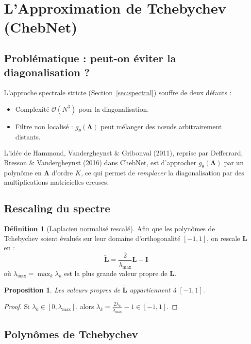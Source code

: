 \documentclass[12pt, a4paper]{article}
\newtheorem{proposition}[theorem]{Proposition}
\theoremstyle{definition}
\newtheorem{definition}[theorem]{Définition}
\newcommand{\mat}[1]{\mathbf{#1}}
\newcommand{\I}{\mat{I}}
\newcommand{\L}{\mat{L}}
\newcommand{\Lt}{\tilde{\mat{L}}}
\newcommand{\Lam}{\mat{\Lambda}}
\begin{document}
\section{L'Approximation de Tchebychev (ChebNet)}
\label{sec:chebnet}

\subsection{Problématique : peut-on éviter la diagonalisation ?}

L'approche spectrale stricte (Section~\ref{sec:spectral}) souffre de deux défauts :
\begin{itemize}
  \item Complexité $\mathcal{O}(N^3)$ pour la diagonalisation.
  \item Filtre non localisé : $g_\theta(\Lam)$ peut mélanger des nœuds arbitrairement distants.
\end{itemize}
L'idée de Hammond, Vandergheynst \& Gribonval (2011), reprise par Defferrard,
Bresson \& Vandergheynst (2016) dans ChebNet, est d'approcher $g_\theta(\Lam)$
par un polynôme en $\Lam$ d'ordre $K$, ce qui permet de \emph{remplacer}
la diagonalisation par des multiplications matricielles creuses.

\subsection{Rescaling du spectre}

\begin{definition}[Laplacien normalisé rescalé]
\label{def:rescaled_laplacian}
Afin que les polynômes de Tchebychev soient évalués sur leur domaine d'orthogonalité
$[-1, 1]$, on rescale $\L$ en :
\[
  \boxed{\Lt = \frac{2}{\lambda_{\max}} \L - \I}
\]
où $\lambda_{\max} = \max_k \lambda_k$ est la plus grande valeur propre de $\L$.
\end{definition}

\begin{proposition}
Les valeurs propres de $\Lt$ appartiennent à $[-1, 1]$.
\end{proposition}

\begin{proof}
Si $\lambda_k \in [0, \lambda_{\max}]$, alors
$\tilde{\lambda}_k = \frac{2\lambda_k}{\lambda_{\max}} - 1 \in [-1, 1]$.
\end{proof}

\subsection{Polynômes de Tchebychev}
\end{document}
